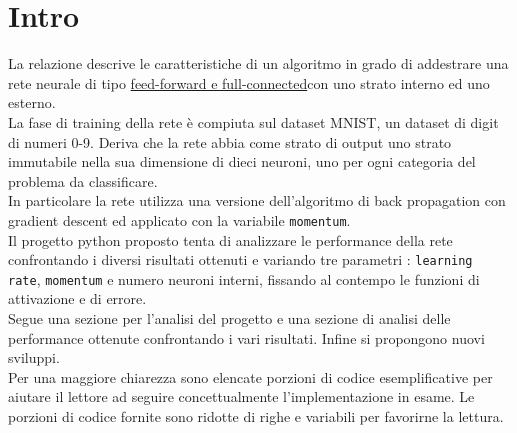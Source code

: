 \chapter{Intro}
La relazione descrive le caratteristiche di un algoritmo in grado di addestrare una rete neurale di tipo \underline{feed-forward e full-connected}\footnotemark con uno strato interno ed uno esterno. \\
La fase di training della rete è compiuta sul dataset MNIST, un dataset di digit di numeri 0-9. Deriva che la rete abbia come strato di output uno strato immutabile nella sua dimensione di dieci neuroni, uno per ogni categoria del problema da classificare. \\
In particolare la rete utilizza una versione dell'algoritmo di back propagation con gradient descent ed applicato con la variabile \texttt{momentum}\footnotemark.\\
Il progetto python proposto tenta di analizzare le performance della rete confrontando i diversi risultati ottenuti e variando tre parametri : \texttt{learning rate}, \texttt{momentum} e numero neuroni interni, fissando al contempo le funzioni di attivazione e di errore.\\
Segue una sezione per l'analisi del progetto e una sezione di analisi delle performance ottenute confrontando i vari risultati. Infine si propongono nuovi sviluppi.\\
Per una maggiore chiarezza sono elencate porzioni di codice esemplificative per aiutare il lettore ad seguire concettualmente l'implementazione in esame. Le porzioni di codice fornite sono ridotte di righe e variabili per favorirne la lettura. 


